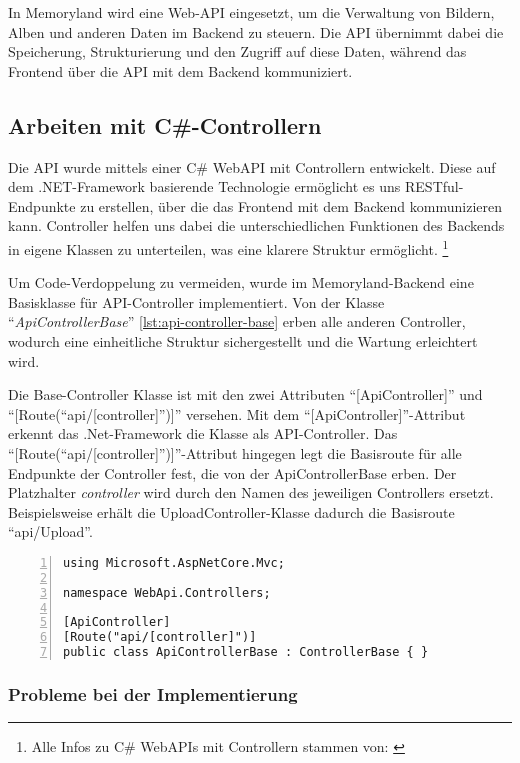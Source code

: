 In Memoryland wird eine Web-API eingesetzt, um die Verwaltung von Bildern, Alben
und anderen Daten im Backend zu steuern. Die API übernimmt dabei die Speicherung, 
Strukturierung und den Zugriff auf diese Daten, während das Frontend über die API 
mit dem Backend kommuniziert.

\subsection{Arbeiten mit C\#-Controllern}

Die API wurde mittels einer C\# WebAPI mit Controllern entwickelt. Diese auf dem .NET-Framework
basierende Technologie ermöglicht es uns RESTful-Endpunkte zu erstellen, über die das Frontend
mit dem Backend kommunizieren kann. Controller helfen uns dabei die unterschiedlichen Funktionen
des Backends in eigene Klassen zu unterteilen, was eine klarere Struktur ermöglicht.
\footnote{Alle Infos zu C\# WebAPIs mit Controllern stammen von: \cite{MicrosoftCorporationaa}}

Um Code-Verdoppelung zu vermeiden, wurde im Memoryland-Backend eine Basisklasse 
für API-Controller implementiert. Von der Klasse ``\emph{ApiControllerBase}'' \ref{lst:api-controller-base} 
erben alle anderen Controller, wodurch eine einheitliche Struktur sichergestellt und die Wartung 
erleichtert wird.

Die Base-Controller Klasse ist mit den zwei Attributen ``[ApiController]'' und 
``[Route(``api/[controller]'')]'' versehen. Mit dem ``[ApiController]''-Attribut 
erkennt das .Net-Framework die Klasse als API-Controller. Das 
``[Route(``api/[controller]'')]''-Attribut hingegen legt die Basisroute für alle Endpunkte 
der Controller fest, die von der ApiControllerBase erben. 
Der Platzhalter \emph{controller} wird durch den Namen des jeweiligen Controllers ersetzt. 
Beispielsweise erhält die UploadController-Klasse dadurch die Basisroute ``api/Upload''.

\begin{lstlisting}[numbers=left,caption={APIControllerBase.cs},label={lst:api-controller-base}]
using Microsoft.AspNetCore.Mvc;

namespace WebApi.Controllers;
    
[ApiController]
[Route("api/[controller]")]
public class ApiControllerBase : ControllerBase { }    
\end{lstlisting}

\subsubsection{Probleme bei der Implementierung}

